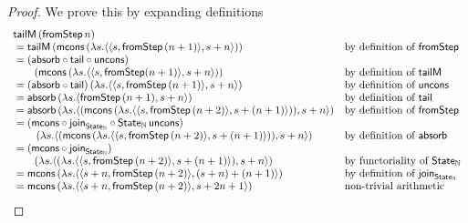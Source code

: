 \begin{proof}
We prove this by expanding definitions
$$
\begin{array}{ll}
\mathsf{tailM}\, (\mathsf{fromStep}\, n) \\
{}= \mathsf{tailM}\, (\mathsf{mcons}\, (\lambda s. \langle \langle s, \mathsf{fromStep}\, (n + 1) \rangle, s + n \rangle))
	& \mbox{by definition of }\mathsf{fromStep} \\
{}= (\mathsf{absorb} \circ \mathsf{tail} \circ \mathsf{uncons})\, \\\qquad (\mathsf{mcons}\, (\lambda s. \langle \langle s, \mathsf{fromStep} (n + 1) \rangle, s + n \rangle))
	& \mbox{by definition of }\mathsf{tailM} \\
{}= (\mathsf{absorb} \circ \mathsf{tail})\, (\lambda s. \langle \langle s, \mathsf{fromStep}\, (n + 1) \rangle, s + n \rangle)
	& \mbox{by definition of }\mathsf{uncons} \\
{}= \mathsf{absorb}\, (\lambda s. \langle \mathsf{fromStep}\, (n + 1), s + n \rangle)
	& \mbox{by definition of }\mathsf{tail} \\
{}= \mathsf{absorb}\, (\lambda s. \langle (\mathsf{mcons}\, (\lambda s. \langle \langle s, \mathsf{fromStep}\, (n + 2) \rangle, s + (n + 1) \rangle)), s + n \rangle)
	& \mbox{by definition of }\mathsf{fromStep} \\
{}= (\mathsf{mcons} \circ \mathsf{join}_{\mathsf{State}_{\mathbb{N}}} \circ \mathsf{State}_{\mathbb{N}}\,\mathsf{uncons}) \\\qquad \, (\lambda s. \langle (\mathsf{mcons}\, (\lambda s. \langle \langle s, \mathsf{fromStep}\, (n + 2) \rangle, s + (n + 1) \rangle)), s + n \rangle)
	& \mbox{by definition of }\mathsf{absorb} \\
{}= (\mathsf{mcons} \circ \mathsf{join}_{\mathsf{State}_{\mathbb{N}}})\, \\\qquad (\lambda s. \langle (\lambda s. \langle \langle s, \mathsf{fromStep}\, (n + 2) \rangle, s + (n + 1) \rangle), s + n \rangle)
	& \mbox{by functoriality of }\mathsf{State}_{\mathbb{N}} \\
{}= \mathsf{mcons}\, (\lambda s. \langle \langle s + n, \mathsf{fromStep}\,(n + 2) \rangle, (s + n) + (n + 1) \rangle)
	& \mbox{by definition of } \mathsf{join}_{\mathsf{State}_{\mathbb{N}}} \\
{}= \mathsf{mcons}\, (\lambda s. \langle \langle s + n, \mathsf{fromStep}\,(n + 2) \rangle, s + 2n + 1 \rangle)
	& \mbox{non-trivial arithmetic} \\
\end{array}
$$
\end{proof}

